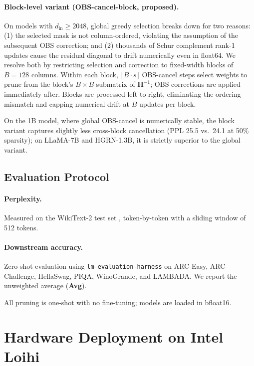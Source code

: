\documentclass{article}
\begin{document}
\paragraph{Block-level variant (OBS-cancel-block, proposed).}
On models with $d_\text{in} \geq 2048$, global greedy selection breaks down
for two reasons: (1) the selected mask is not column-ordered, violating the
assumption of the subsequent OBS correction; and (2) thousands of Schur
complement rank-1 updates cause the residual diagonal to drift numerically
even in float64. We resolve both by restricting selection and correction to
fixed-width blocks of $B = 128$ columns. Within each block,
$\lfloor B \cdot s \rfloor$ OBS-cancel steps select weights to prune from the
block's $B \times B$ submatrix of $\mathbf{H}^{-1}$; OBS corrections are
applied immediately after. Blocks are processed left to right, eliminating
the ordering mismatch and capping numerical drift at $B$ updates per block.

On the 1B model, where global OBS-cancel is numerically stable, the block
variant captures slightly less cross-block cancellation (PPL 25.5 vs.\ 24.1
at 50\% sparsity); on LLaMA-7B and HGRN-1.3B, it is strictly superior to the
global variant.

\subsection{Evaluation Protocol}

\paragraph{Perplexity.}
Measured on the WikiText-2 test set \citep{merity2016pointer}, token-by-token
with a sliding window of 512 tokens.

\paragraph{Downstream accuracy.}
Zero-shot evaluation using \texttt{lm-evaluation-harness}
\citep{eval-harness} on ARC-Easy, ARC-Challenge, HellaSwag, PIQA,
WinoGrande, and LAMBADA. We report the unweighted average (\textbf{Avg}).

All pruning is one-shot with no fine-tuning; models are loaded in bfloat16.


\section{Hardware Deployment on Intel Loihi}
\label{sec:hardware}
\end{document}
